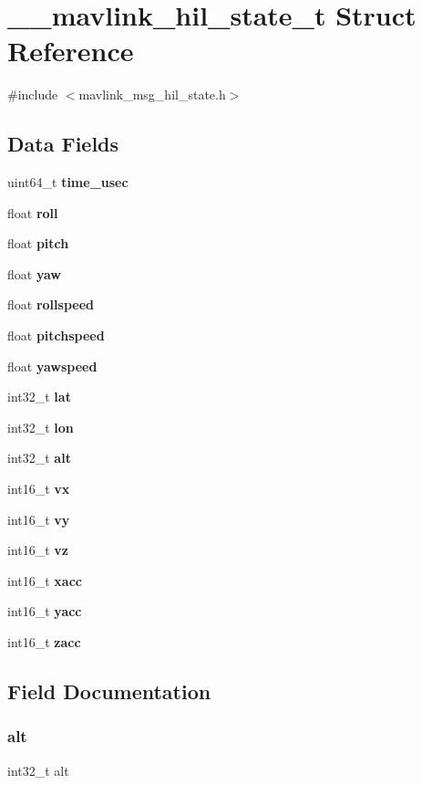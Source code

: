 \section{\+\_\+\+\_\+mavlink\+\_\+hil\+\_\+state\+\_\+t Struct Reference}
\label{struct____mavlink__hil__state__t}


{\ttfamily \#include $<$mavlink\+\_\+msg\+\_\+hil\+\_\+state.\+h$>$}

\subsection*{Data Fields}
\begin{DoxyCompactItemize}
\item 
uint64\+\_\+t \textbf{ time\+\_\+usec}
\item 
float \textbf{ roll}
\item 
float \textbf{ pitch}
\item 
float \textbf{ yaw}
\item 
float \textbf{ rollspeed}
\item 
float \textbf{ pitchspeed}
\item 
float \textbf{ yawspeed}
\item 
int32\+\_\+t \textbf{ lat}
\item 
int32\+\_\+t \textbf{ lon}
\item 
int32\+\_\+t \textbf{ alt}
\item 
int16\+\_\+t \textbf{ vx}
\item 
int16\+\_\+t \textbf{ vy}
\item 
int16\+\_\+t \textbf{ vz}
\item 
int16\+\_\+t \textbf{ xacc}
\item 
int16\+\_\+t \textbf{ yacc}
\item 
int16\+\_\+t \textbf{ zacc}
\end{DoxyCompactItemize}


\subsection{Field Documentation}
\mbox{\label{struct____mavlink__hil__state__t_a677cbc2ca7dc4e9f0516bd42110f0062}} 
\subsubsection{alt}
{\footnotesize\ttfamily int32\+\_\+t alt}

